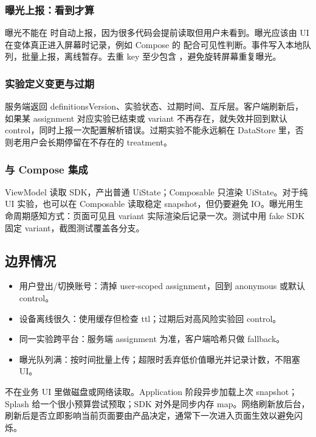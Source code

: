 \subsubsection{曝光上报：看到才算}

曝光不能在  时自动上报，因为很多代码会提前读取但用户未看到。曝光应该由 UI 在变体真正进入屏幕时记录，例如 Compose 的  配合可见性判断。事件写入本地队列，批量上报，离线暂存。去重 key 至少包含 ，避免旋转屏幕重复曝光。

\subsubsection{实验定义变更与过期}

服务端返回 definitionsVersion、实验状态、过期时间、互斥层。客户端刷新后，如果某 assignment 对应实验已结束或 variant 不再存在，就失效并回到默认 control，同时上报一次配置解析错误。过期实验不能永远躺在 DataStore 里，否则老用户会长期停留在不存在的 treatment。

\subsubsection{与 Compose 集成}

ViewModel 读取 SDK，产出普通 UiState；Composable 只渲染 UiState。对于纯 UI 实验，也可以在 Composable 读取稳定 snapshot，但仍要避免 IO。曝光用生命周期感知方式：页面可见且 variant 实际渲染后记录一次。测试中用 fake SDK 固定 variant，截图测试覆盖各分支。

\subsection{边界情况}

\begin{itemize}
  \item 用户登出/切换账号：清掉 user-scoped assignment，回到 anonymous 或默认 control。
  \item 设备离线很久：使用缓存但检查 ttl；过期后对高风险实验回 control。
  \item 同一实验跨平台：服务端 assignment 为准，客户端哈希只做 fallback。
  \item 曝光队列满：按时间批量上传；超限时丢弃低价值曝光并记录计数，不阻塞 UI。
\end{itemize}

\begin{followup}
不在业务 UI 里做磁盘或网络读取。Application 阶段异步加载上次 snapshot；Splash 给一个很小预算尝试预取；SDK 对外是同步内存 map。网络刷新放后台，刷新后是否立即影响当前页面要由产品决定，通常下一次进入页面生效以避免闪烁。
\end{followup}

